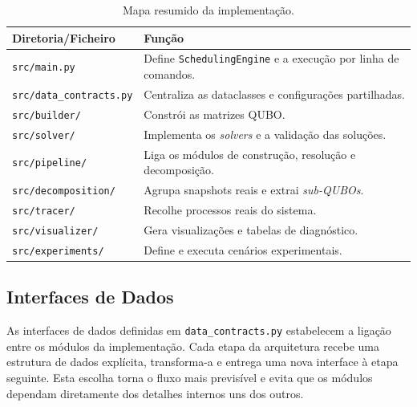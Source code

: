 \begin{table}[H]
\centering
\small
\begin{tabular}{p{}p{}}
\hline
\textbf{Diretoria/Ficheiro} & \textbf{Função} \\
\hline
\texttt{src/main.py} & Define \texttt{SchedulingEngine} e a execução por linha de comandos. \\
\texttt{src/data\_contracts.py} & Centraliza as dataclasses e configurações partilhadas. \\
\texttt{src/builder/} & Constrói as matrizes \acs{QUBO}. \\
\texttt{src/solver/} & Implementa os \textit{solvers} e a validação das soluções. \\
\texttt{src/pipeline/} & Liga os módulos de construção, resolução e decomposição. \\
\texttt{src/decomposition/} & Agrupa snapshots reais e extrai \textit{sub-QUBOs}. \\
\texttt{src/tracer/} & Recolhe processos reais do sistema. \\
\texttt{src/visualizer/} & Gera visualizações e tabelas de diagnóstico. \\
\texttt{src/experiments/} & Define e executa cenários experimentais. \\
\hline
\end{tabular}
\caption{Mapa resumido da implementação.}
\label{tab:mapa-implementacao}
\end{table}

\subsection{Interfaces de Dados}
\label{subsec:interfaces-dados}

As interfaces de dados definidas em \texttt{data\_contracts.py} estabelecem a ligação
entre os módulos da implementação. Cada etapa da arquitetura recebe uma
estrutura de dados explícita, transforma-a e entrega uma nova interface à etapa
seguinte. Esta escolha torna o fluxo mais previsível e evita que os módulos
dependam diretamente dos detalhes internos uns dos outros.

